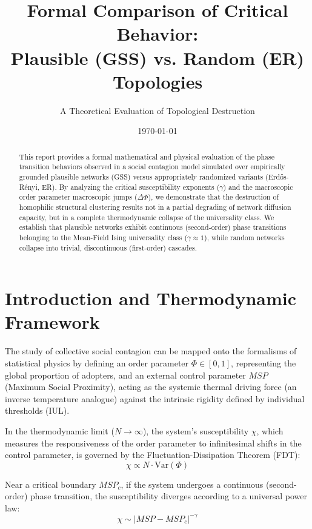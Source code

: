\documentclass[12pt, a4paper]{article}
\title{Formal Comparison of Critical Behavior: \\ Plausible (GSS) vs. Random (ER) Topologies}
\author{A Theoretical Evaluation of Topological Destruction}
\date{\today}
\begin{document}
\maketitle

\begin{abstract}
This report provides a formal mathematical and physical evaluation of the phase transition behaviors observed in a social contagion model simulated over empirically grounded plausible networks (GSS) versus appropriately randomized variants (Erdős-Rényi, ER). By analyzing the critical susceptibility exponents ($\gamma$) and the macroscopic order parameter macroscopic jumps ($\Delta \Phi$), we demonstrate that the destruction of homophilic structural clustering results not in a partial degrading of network diffusion capacity, but in a complete thermodynamic collapse of the universality class. We establish that plausible networks exhibit continuous (second-order) phase transitions belonging to the Mean-Field Ising universality class ($\gamma \approx 1$), while random networks collapse into trivial, discontinuous (first-order) cascades.
\end{abstract}

\section{Introduction and Thermodynamic Framework}

The study of collective social contagion can be mapped onto the formalisms of statistical physics by defining an order parameter $\Phi \in [0, 1]$, representing the global proportion of adopters, and an external control parameter $MSP$ (Maximum Social Proximity), acting as the systemic thermal driving force (an inverse temperature analogue) against the intrinsic rigidity defined by individual thresholds (IUL). 

In the thermodynamic limit ($N \to \infty$), the system's susceptibility $\chi$, which measures the responsiveness of the order parameter to infinitesimal shifts in the control parameter, is governed by the Fluctuation-Dissipation Theorem (FDT):
\begin{equation}
    \chi \propto N \cdot \text{Var}(\Phi)
\end{equation}

Near a critical boundary $MSP_c$, if the system undergoes a continuous (second-order) phase transition, the susceptibility diverges according to a universal power law:
\begin{equation}
    \chi \sim |MSP - MSP_c|^{-\gamma}
\end{equation}
\end{document}
